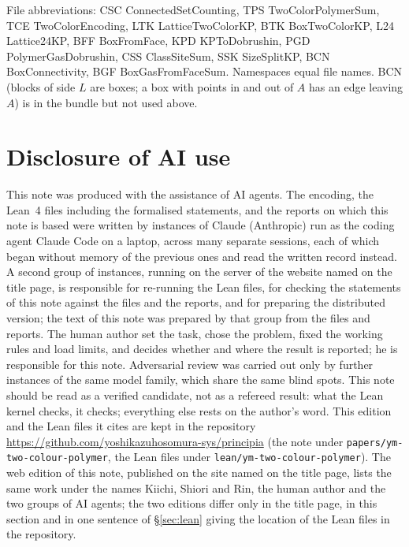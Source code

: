 \documentclass[11pt,a4paper]{article}
\theoremstyle{definition}
\theoremstyle{remark}
\DeclareRobustCommand{\lean}[1]{{\ttfamily\renewcommand{\_}{\textunderscore\allowbreak}#1}}
\begin{document}
{\sloppy\noindent File abbreviations: CSC \lean{ConnectedSetCounting}, TPS \lean{TwoColorPolymerSum}, TCE \lean{TwoColorEncoding}, LTK \lean{LatticeTwoColorKP}, BTK \lean{BoxTwoColorKP}, L24 \lean{Lattice24KP}, BFF \lean{BoxFromFace}, KPD \lean{KPToDobrushin}, PGD \lean{PolymerGasDobrushin}, CSS \lean{ClassSiteSum}, SSK \lean{SizeSplitKP}, BCN \lean{BoxConnectivity}, BGF \lean{BoxGasFromFaceSum}. Namespaces equal file names. BCN (blocks of side $L$ are boxes; a box with points in and out of $A$ has an edge leaving $A$) is in the bundle but not used above.\par}

\section{Disclosure of AI use}\label{sec:ai}
This note was produced with the assistance of AI agents. The encoding, the Lean~4 files including the formalised statements, and the reports on which this note is based were written by instances of Claude (Anthropic) run as the coding agent Claude Code on a laptop, across many separate sessions, each of which began without memory of the previous ones and read the written record instead. A second group of instances, running on the server of the website named on the title page, is responsible for re-running the Lean files, for checking the statements of this note against the files and the reports, and for preparing the distributed version; the text of this note was prepared by that group from the files and reports. The human author set the task, chose the problem, fixed the working rules and load limits, and decides whether and where the result is reported; he is responsible for this note. Adversarial review was carried out only by further instances of the same model family, which share the same blind spots. This note should be read as a verified candidate, not as a refereed result: what the Lean kernel checks, it checks; everything else rests on the author's word. This edition and the Lean files it cites are kept in the repository \url{https://github.com/yoshikazuhosomura-sys/principia} (the note under \texttt{papers/\allowbreak{}ym-two-colour-polymer}, the Lean files under \texttt{lean/\allowbreak{}ym-two-colour-polymer}). The web edition of this note, published on the site named on the title page, lists the same work under the names Kiichi, Shiori and Rin, the human author and the two groups of AI agents; the two editions differ only in the title page, in this section and in one sentence of \S\ref{sec:lean} giving the location of the Lean files in the repository.
\end{document}
